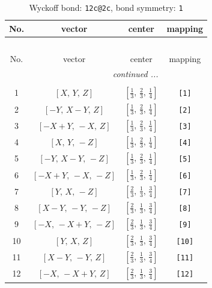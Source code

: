 \documentclass[fleqn,8pt]{jsarticle}
\begin{document}
\renewcommand{\arraystretch}{1.2}
\begin{longtable}{cccc}
\caption{Wyckoff bond: {\tt 12c@2c}, bond symmetry: {\tt 1}}
 \\
 \hline \hline
No. & vector & center & mapping \\ \hline \endfirsthead

\multicolumn{3}{l}{\tablename\ \thetable{}} \\
 \hline \hline
No. & vector & center & mapping \\ \hline \endhead

 \hline \hline
\multicolumn{3}{r}{\footnotesize\it continued ...} \\ \endfoot

 \hline \hline
\multicolumn{3}{r}{} \\ \endlastfoot

1 & $\left[ X,\, Y,\, Z \right]$ & $\left[ \frac{1}{3},\, \frac{2}{3},\, \frac{1}{4} \right]$ & {\tt [1]} \\ \hline
2 & $\left[ - Y,\, X - Y,\, Z \right]$ & $\left[ \frac{1}{3},\, \frac{2}{3},\, \frac{1}{4} \right]$ & {\tt [2]} \\ \hline
3 & $\left[ - X + Y,\, - X,\, Z \right]$ & $\left[ \frac{1}{3},\, \frac{2}{3},\, \frac{1}{4} \right]$ & {\tt [3]} \\ \hline
4 & $\left[ X,\, Y,\, - Z \right]$ & $\left[ \frac{1}{3},\, \frac{2}{3},\, \frac{1}{4} \right]$ & {\tt [4]} \\ \hline
5 & $\left[ - Y,\, X - Y,\, - Z \right]$ & $\left[ \frac{1}{3},\, \frac{2}{3},\, \frac{1}{4} \right]$ & {\tt [5]} \\ \hline
6 & $\left[ - X + Y,\, - X,\, - Z \right]$ & $\left[ \frac{1}{3},\, \frac{2}{3},\, \frac{1}{4} \right]$ & {\tt [6]} \\ \hline
7 & $\left[ Y,\, X,\, - Z \right]$ & $\left[ \frac{2}{3},\, \frac{1}{3},\, \frac{3}{4} \right]$ & {\tt [7]} \\ \hline
8 & $\left[ X - Y,\, - Y,\, - Z \right]$ & $\left[ \frac{2}{3},\, \frac{1}{3},\, \frac{3}{4} \right]$ & {\tt [8]} \\ \hline
9 & $\left[ - X,\, - X + Y,\, - Z \right]$ & $\left[ \frac{2}{3},\, \frac{1}{3},\, \frac{3}{4} \right]$ & {\tt [9]} \\ \hline
10 & $\left[ Y,\, X,\, Z \right]$ & $\left[ \frac{2}{3},\, \frac{1}{3},\, \frac{3}{4} \right]$ & {\tt [10]} \\ \hline
11 & $\left[ X - Y,\, - Y,\, Z \right]$ & $\left[ \frac{2}{3},\, \frac{1}{3},\, \frac{3}{4} \right]$ & {\tt [11]} \\ \hline
12 & $\left[ - X,\, - X + Y,\, Z \right]$ & $\left[ \frac{2}{3},\, \frac{1}{3},\, \frac{3}{4} \right]$ & {\tt [12]} \\
\end{longtable}
\end{document}
